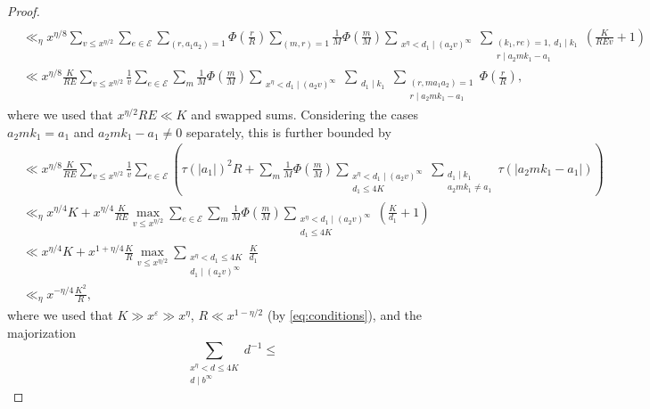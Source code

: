 \documentclass[reqno,11pt]{amsart}
\theoremstyle{definition}
\theoremstyle{remark}
\numberwithin{equation}{section}
\newcommand{\msE}{\mathscr{E}}
\newcommand{\eps}{\varepsilon}
\begin{document}
\begin{proof}
\[\begin{aligned}
    \\
    &\ll_\eta 
    x^{\eta/8} \sum_{v \le x^{\eta/2}}
    \sum_{e \in \msE} \sum_{(r,a_1a_2)=1} \Phi\left(\frac{r}{R}\right) \sum_{(m, r) = 1} \frac{1}{M} \Phi\left(\frac{m}{M}\right) 
    \sum_{\substack{x^\eta < d_1 \mid (a_2v)^\infty}} 
    \sum_{\substack{(k_1, re) = 1,\ d_1 \mid k_1 \\ r \mid a_2 m k_1 - a_1}} \left(\frac{K}{REv} + 1\right)
    \\
    &\ll 
    x^{\eta/8} \frac{K}{RE} \sum_{v \le x^{\eta/2}} \frac{1}{v}
    \sum_{e \in \msE} \sum_{m} \frac{1}{M} \Phi\left(\frac{m}{M}\right) 
    \sum_{\substack{x^\eta < d_1 \mid (a_2v)^\infty}} 
    \sum_{\substack{d_1 \mid k_1}}
    \sum_{\substack{(r,m a_1a_2)=1 \\ r \mid a_2 m k_1 - a_1}} \Phi\left(\frac{r}{R}\right),
\end{aligned} 
\]
where we used that $x^{\eta/2} RE \ll K$ and swapped sums. Considering the cases $a_2 m k_1 = a_1$ and $a_2 m k_1 - a_1 \neq 0$ separately, this is further bounded by
\[
\begin{aligned}
    &\ll 
    x^{\eta/8} \frac{K}{RE} \sum_{v \le x^{\eta/2}} \frac{1}{v}
    \sum_{e \in \msE} \left(\tau(|a_1|)^2 R + \sum_{m} \frac{1}{M} \Phi\left(\frac{m}{M}\right) 
    \sum_{\substack{x^\eta < d_1 \mid (a_2v)^\infty \\ d_1 \le 4K}} 
    \sum_{\substack{d_1 \mid k_1 \\ a_2 m k_1 \neq a_1}} 
    \tau(|a_2 m k_1 - a_1|) \right)
    \\
    &\ll_\eta
    x^{\eta/4}K + x^{\eta/4} \frac{K}{RE} \max_{v \le x^{\eta/2}}
    \sum_{e \in \msE} \sum_{m} \frac{1}{M} \Phi\left(\frac{m}{M}\right) 
    \sum_{\substack{x^\eta < d_1 \mid (a_2v)^\infty \\ d_1 \le 4K}} 
    \left(\frac{K}{d_1} + 1\right)
    \\
    &\ll 
    x^{\eta/4}K +
    x^{1 + \eta/4} \frac{K}{R} \max_{v \le x^{\eta/2}} \sum_{\substack{x^\eta < d_1 \le 4K \\ d_1 \mid (a_2 v)^\infty }} \frac{K}{d_1}
    \\
    &\ll_\eta 
    x^{-\eta/4} \frac{K^2}{R},
\end{aligned}
\]
where we used that $K \gg x^{\eps} \gg x^\eta$, $R \ll x^{1-\eta/2}$ (by \cref{eq:conditions}), and the majorization 
\begin{equation} \label{eq:harmonic-divisors}
    \sum_{\substack{x^\eta < d \le 4K \\ d \mid b^\infty }} d^{-1} \le

\end{equation}
\end{proof}
\end{document}
